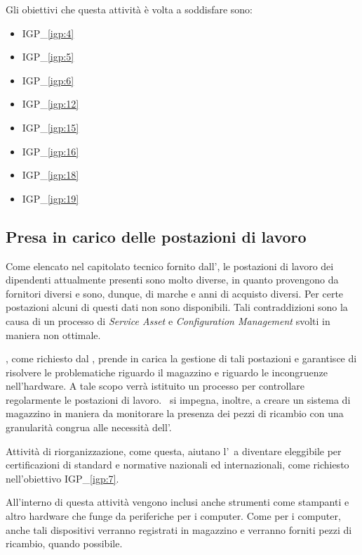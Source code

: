 		Gli obiettivi che questa attività è volta a soddisfare sono:
		\begin{itemize}[noitemsep]
			\renewcommand\labelitemi{--}
			\item {\color{pantone}IGP\_\ref{igp:4}}
			\item {\color{pantone}IGP\_\ref{igp:5}}
			\item {\color{pantone}IGP\_\ref{igp:6}}
			\item {\color{pantone}IGP\_\ref{igp:12}}
			\item {\color{pantone}IGP\_\ref{igp:15}}
			\item {\color{pantone}IGP\_\ref{igp:16}}
			\item {\color{pantone}IGP\_\ref{igp:18}}
			\item {\color{pantone}IGP\_\ref{igp:19}}
		\end{itemize}

	\subsection{Presa in carico delle postazioni di lavoro}
	
		Come elencato nel capitolato tecnico fornito dall'\istituto, le postazioni di lavoro dei dipendenti attualmente presenti sono molto diverse, in quanto provengono da fornitori diversi e sono, dunque, di marche e anni di acquisto diversi.
		Per certe postazioni alcuni di questi dati non sono disponibili.
		Tali contraddizioni sono la causa di un processo di \textit{Service Asset} e \textit{Configuration Management} svolti in maniera non ottimale.
		
		\azienda, come richiesto dal \proponente, prende in carica la gestione di tali postazioni e garantisce di risolvere le problematiche riguardo il magazzino e riguardo le incongruenze nell'hardware.
		A tale scopo verrà istituito un processo per controllare regolarmente le postazioni di lavoro.
		\azienda~si impegna, inoltre, a creare un sistema di magazzino in maniera da monitorare la presenza dei pezzi di ricambio con una granularità congrua alle necessità dell'\istituto.
		
		Attività di riorganizzazione, come questa, aiutano l'\istituto~a diventare eleggibile per certificazioni di standard e normative nazionali ed internazionali, come richiesto nell'obiettivo {\color{pantone}IGP\_\ref{igp:7}}.
		
		All'interno di questa attività vengono inclusi anche strumenti come stampanti e altro hardware che funge da periferiche per i computer.
		Come per i computer, anche tali dispositivi verranno registrati in magazzino e verranno forniti pezzi di ricambio, quando possibile.
		
